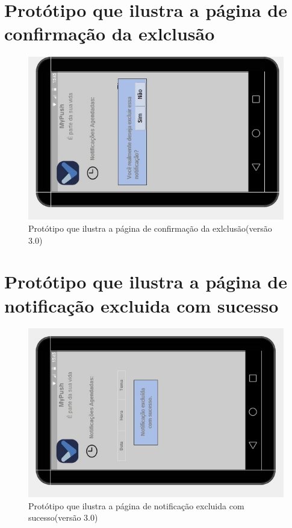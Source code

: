 \begin{apendicesenv}
    \pagebreak
      \section*{Protótipo que ilustra a página de confirmação da exlclusão}

    \begin{figure}[!htbp]
      \centering
      \includegraphics[scale=0.9, angle=-90]{editaveis/figuras/prototipo_alta_fidelidade_v3/3_11}
      \caption{Protótipo que ilustra a página de confirmação da exlclusão(versão 3.0)}
      \label{v3}
    \end{figure}
    
    \pagebreak
      \section*{Protótipo que ilustra a página de notificação excluida com sucesso}

    \begin{figure}[!htbp]
      \centering
      \includegraphics[scale=0.9, angle=-90]{editaveis/figuras/prototipo_alta_fidelidade_v3/3_12}
      \caption{Protótipo que ilustra a página de notificação excluida com sucesso(versão 3.0)}
      \label{v3}
    \end{figure}
    

\end{apendicesenv}
